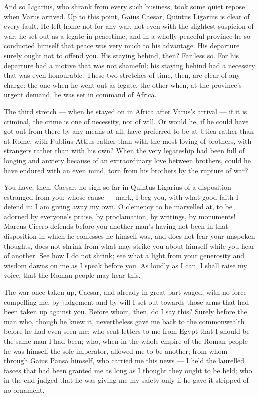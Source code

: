  And so Ligarius, who shrank from every such business, took some quiet repose when Varus arrived. Up to this point, Gaius Caesar, Quintus Ligarius is clear of every fault. He left home not for any war, not even with the slightest suspicion of war; he set out as a legate in peacetime, and in a wholly peaceful province he so conducted himself that peace was very much to his advantage. His departure surely ought not to offend you. His staying behind, then? Far less so. For his departure had a motive that was not shameful; his staying behind had a necessity that was even honourable. These two stretches of time, then, are clear of any charge: the one when he went out as legate, the other when, at the province's urgent demand, he was set in command of Africa.

 The third stretch --- when he stayed on in Africa after Varus's arrival --- if it is criminal, the crime is one of necessity, not of will. Or would he, if he could have got out from there by any means at all, have preferred to be at Utica rather than at Rome, with Publius Attius rather than with the most loving of brothers, with strangers rather than with his own? When the very legateship had been full of longing and anxiety because of an extraordinary love between brothers, could he have endured with an even mind, torn from his brothers by the rupture of war?

 You have, then, Caesar, no sign so far in Quintus Ligarius of a disposition estranged from you; whose cause --- mark, I beg you, with what good faith I defend it: I am giving away my own. O clemency to be marvelled at, to be adorned by everyone's praise, by proclamation, by writings, by monuments! Marcus Cicero defends before you another man's having not been in that disposition in which he confesses he himself was, and does not fear your unspoken thoughts, does not shrink from what may strike you about himself while you hear of another. See how I do not shrink; see what a light from your generosity and wisdom dawns on me as I speak before you. As loudly as I can, I shall raise my voice, that the Roman people may hear this.

 The war once taken up, Caesar, and already in great part waged, with no force compelling me, by judgement and by will I set out towards those arms that had been taken up against you. Before whom, then, do I say this? Surely before the man who, though he knew it, nevertheless gave me back to the commonwealth before he had even seen me; who sent letters to me from Egypt that I should be the same man I had been; who, when in the whole empire of the Roman people he was himself the sole imperator, allowed me to be another; from whom --- through Gaius Pansa himself, who carried me this news --- I held the laurelled fasces that had been granted me as long as I thought they ought to be held; who in the end judged that he was giving me my safety only if he gave it stripped of no ornament.

